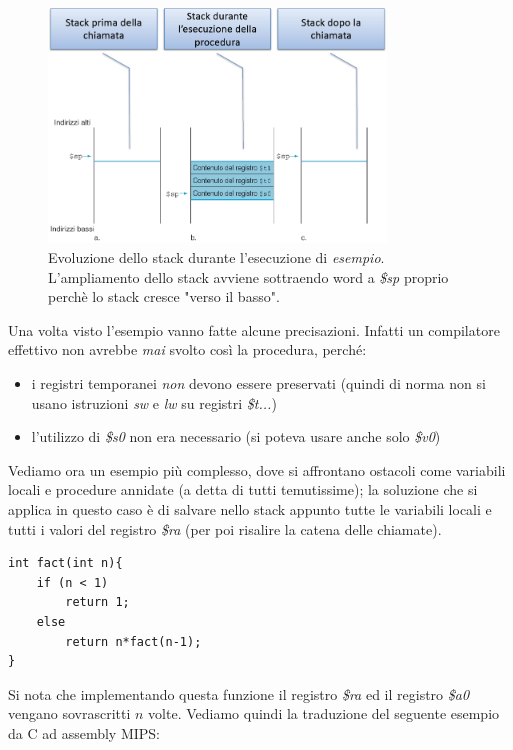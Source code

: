 \documentclass[class=book, crop=false]{standalone}
\begin{document}
\begin{figure}[H]
	\centering
	\caption{Evoluzione dello stack durante l'esecuzione di \emph{esempio}. L'ampliamento dello stack avviene sottraendo word a \emph{\$sp} proprio perchè lo stack cresce "verso il basso".}
	\includegraphics[width=0.8\textwidth,keepaspectratio]{Evoluzione-stack}
\end{figure}

Una volta visto l'esempio vanno fatte alcune precisazioni. Infatti un compilatore effettivo non avrebbe \emph{mai} svolto così la procedura, perché:
\begin{itemize}
	\item i registri temporanei \emph{non} devono essere preservati (quindi di norma non si usano istruzioni \emph{sw} e \emph{lw} su registri \emph{\$t...})
	\item l'utilizzo di \emph{\$s0} non era necessario (si poteva usare anche solo \emph{\$v0})
\end{itemize}

Vediamo ora un esempio più complesso, dove si affrontano ostacoli come variabili locali e procedure annidate (a detta di tutti temutissime); la soluzione che si applica in questo caso è di salvare nello stack appunto tutte le variabili locali e tutti i valori del registro \emph{\$ra} (per poi risalire la catena delle chiamate).

\begin{verbatim}
int fact(int n){
	if (n < 1)
		return 1;
	else
		return n*fact(n-1);
}
\end{verbatim}

Si nota che implementando questa funzione il registro \emph{\$ra} ed il registro \emph{\$a0} vengano sovrascritti $n$ volte.
Vediamo quindi la traduzione del seguente esempio da C ad assembly MIPS:
\end{document}

